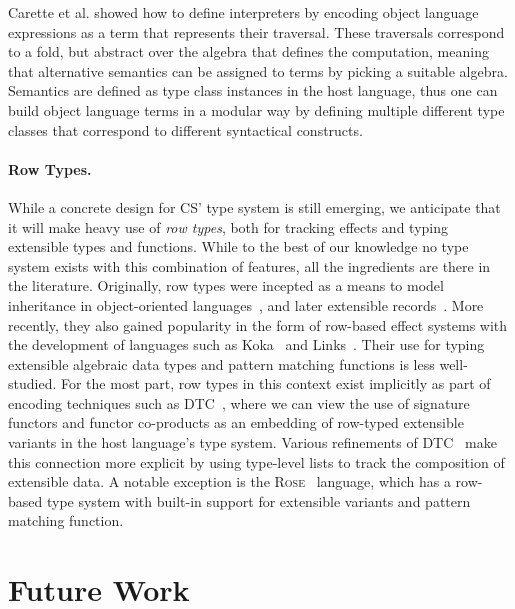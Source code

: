 \documentclass[runningheads]{llncs}
\newcommand{\strachey}{\textsc{CS}}
\begin{document}
Carette et al. \cite{DBLP:journals/jfp/CaretteKS09} showed how to define
interpreters by encoding object language expressions as a term that represents
their traversal. These traversals correspond to a fold, but abstract over the
algebra that defines the computation, meaning that alternative semantics can be
assigned to terms by picking a suitable algebra. Semantics are defined as type
class instances in the host language, thus one can build object language terms
in a modular way by defining multiple different type classes that correspond to
different syntactical constructs.

\paragraph{Row Types.}

While a concrete design for \strachey{}' type system is still emerging, we
anticipate that it will make heavy use of \emph{row types}, both for tracking
effects and typing extensible types and functions. While to the best of our
knowledge no type system exists with this combination of features, all the
ingredients are there in the literature. Originally, row types were incepted as
a means to model inheritance in object-oriented
languages~\cite{DBLP:conf/lics/Wand89,DBLP:conf/popl/Remy89}, and later
extensible records~\cite{DBLP:conf/icfp/BlumeAC06,gaster1996polymorphic}. More
recently, they also gained popularity in the form of row-based effect systems
with the development of languages such as Koka~\cite{DBLP:conf/popl/Leijen17}
and Links~\cite{DBLP:conf/tldi/LindleyC12}. Their use for typing extensible
algebraic data types and pattern matching functions is less well-studied. For
the most part, row types in this context exist implicitly as part of encoding
techniques such as DTC~\cite{DBLP:journals/jfp/Swierstra08}, where we can view
the use of signature functors and functor co-products as an embedding of
row-typed extensible variants in the host language's type system. Various
refinements of
DTC~\cite{DBLP:conf/haskell/Morris15,DBLP:conf/haskell/OliveiraMY15,DBLP:conf/icfp/Bahr14}
make this connection more explicit by using type-level lists to track the
composition of extensible data. A notable exception is the
\textsc{Rose}~\cite{DBLP:journals/pacmpl/MorrisM19} language, which has a
row-based type system with built-in support for extensible variants and pattern
matching function.
\section{Future Work}
\end{document}
